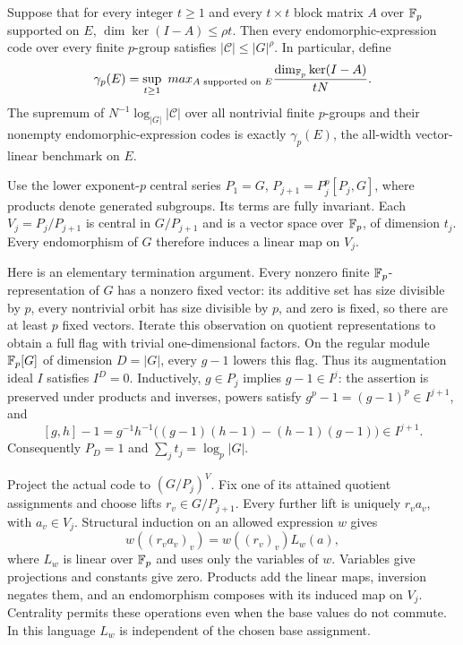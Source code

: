 \begin{theorem}
\notformalized
\label{thm:mc-group-transfer}
Suppose that for every integer $t\ge1$ and every $t\times t$ block
matrix $A$ over $\mathbb{F}_p$ supported on $E$,
$\dim\ker(I-A)\le\rho t$. Then every endomorphic-expression code
over every finite $p$-group satisfies $|\mathcal C|\le|G|^\rho$.
In particular, define
\[
 \gamma_p(E)=\sup_{t\ge1}\ max_{A\text{ supported on }E}
                    \frac{\dim_{\mathbb{F}_p}\ker(I-A)}{tN}.
\]
The supremum of $N^{-1}\log_{|G|}|\mathcal C|$ over all nontrivial
finite $p$-groups and their nonempty endomorphic-expression codes is
exactly $\gamma_p(E)$, the all-width vector-linear benchmark on $E$.
\end{theorem}
\begin{informalproof}
Use the lower exponent-$p$ central series
$P_1=G$, $P_{j+1}=P_j^p[P_j,G]$, where products denote generated
subgroups. Its terms are fully invariant. Each
$V_j=P_j/P_{j+1}$ is central in $G/P_{j+1}$ and is a vector space
over $\mathbb{F}_p$, of dimension $t_j$. Every endomorphism of $G$ therefore
induces a linear map on $V_j$.

Here is an elementary termination argument. Every nonzero finite
$\mathbb{F}_p$-representation of $G$ has a nonzero fixed vector: its additive
set has size divisible by $p$, every nontrivial orbit has size divisible
by $p$, and zero is fixed, so there are at least $p$ fixed vectors.
Iterate this observation on quotient representations to obtain a full
flag with trivial one-dimensional factors. On the regular module
$\mathbb{F}_p[G]$ of dimension $D=|G|$, every $g-1$ lowers this flag.
Thus its augmentation ideal $I$ satisfies $I^D=0$.
Inductively, $g\in P_j$ implies $g-1\in I^j$: the assertion is
preserved under products and inverses, powers satisfy
$g^p-1=(g-1)^p\in I^{j+1}$, and
\[
 [g,h]-1=g^{-1}h^{-1}
       \bigl((g-1)(h-1)-(h-1)(g-1)\bigr)\in I^{j+1}.
\]
Consequently $P_D=1$ and $\sum_jt_j=\log_p|G|$.

Project the actual code to $(G/P_j)^V$. Fix one of its attained
quotient assignments and choose lifts $r_v\in G/P_{j+1}$.
Every further lift is uniquely $r_va_v$, with $a_v\in V_j$.
Structural induction on an allowed expression $w$ gives
\[
 w((r_va_v)_v)=w((r_v)_v)L_w(a),
\]
where $L_w$ is linear over $\mathbb{F}_p$ and uses only the variables of $w$.
Variables give projections and constants give zero. Products add the
linear maps, inversion negates them, and an endomorphism composes with
its induced map on $V_j$. Centrality permits these operations even
when the base values do not commute. In this language $L_w$ is
independent of the chosen base assignment.


\end{informalproof}
